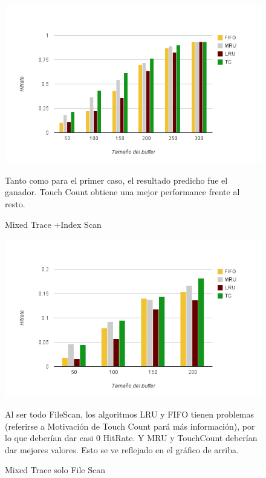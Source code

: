 
\begin{figure}[ht]
\includegraphics[scale=.80]{grafico2-2}
\caption{Mixed Trace +Index Scan}
Tanto como para el primer caso, el resultado predicho fue el ganador. Touch Count obtiene una mejor performance frente al resto.
\end{figure}

\clearpage

\begin{figure}[Ht]
\includegraphics[scale=.80]{grafico3}
\caption{Mixed Trace solo File Scan}
Al ser todo FileScan, los algoritmos LRU y FIFO tienen problemas (referirse a Motivación de Touch Count pará más información), por lo que deberían dar casi 0 HitRate.
Y MRU y TouchCount deberían dar mejores valores. Esto se ve reflejado en el gráfico de arriba.
\end{figure}



